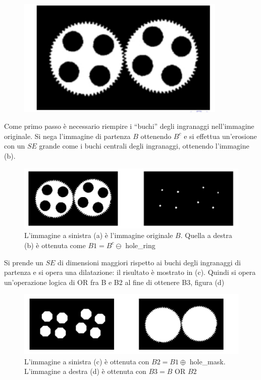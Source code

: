 \begin{figure}[H]
    \centering
    \includegraphics[width=10cm, keepaspectratio]{capitoli/immagini/imgs/orologi-esempio.png}
\end{figure}

Come primo passo è necessario riempire i “buchi” degli ingranaggi nell'immagine originale.
Si nega l'immagine di partenza $B$ ottenendo $B^c$ e si effettua un'erosione
con un $SE$ grande come i buchi centrali degli ingranaggi, ottenendo
l'immagine (b).

\begin{figure}[H]
    \centering
    \includegraphics[width=\linewidth, keepaspectratio]{capitoli/immagini/imgs/orologi2.png}
    \caption{L'immagine a sinistra (a) è l'immagine originale $B$. Quella a destra (b) è ottenuta come $B1=B^c \ominus$ hole\_ring}
\end{figure}

Si prende un $SE$ di dimensioni maggiori rispetto ai buchi degli ingranaggi di partenza e si opera una dilatazione: il risultato è
mostrato in (c). Quindi si opera un'operazione logica di OR fra B e B2 al fine di ottenere B3, figura (d)

\begin{figure}[H]
    \centering
    \includegraphics[width=\linewidth, keepaspectratio]{capitoli/immagini/imgs/orologi3.png}
    \caption*{L'immagine a sinistra (c) è ottenuta con $B2 = B1 \oplus$ hole\_mask. L'immagine a destra (d) è ottenuta con $B3 = B \text{ OR } B2$}
\end{figure}

